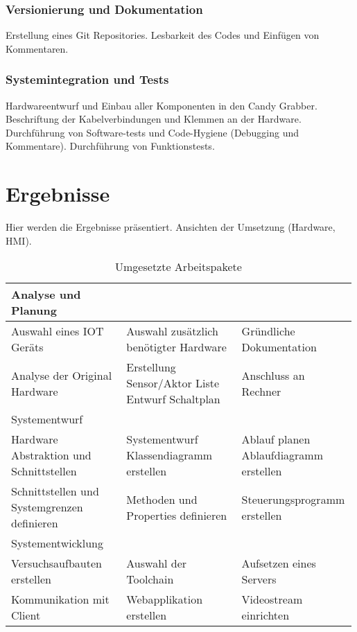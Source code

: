 \documentclass[BMR,Bachelor,ngerman]{twbook}%
\begin{document}
\subsection{Versionierung und Dokumentation}
Erstellung eines Git Repositories. Lesbarkeit des Codes und Einfügen von Kommentaren.
\subsection{Systemintegration und Tests}
Hardwareentwurf und Einbau aller Komponenten in den Candy Grabber. Beschriftung der Kabelverbindungen und Klemmen an der Hardware. Durchführung von Software-tests und Code-Hygiene (Debugging und Kommentare). Durchführung von Funktionstests.
%
\clearpage
\chapter{Ergebnisse}
Hier werden die Ergebnisse präsentiert. Ansichten der Umsetzung (Hardware, HMI).
\begin{table}[!htbp]
\caption{Umgesetzte Arbeitspakete}
\centering
\begin{tabular}{| p{0.33\linewidth}| p{0.33\linewidth} | p{0.33\linewidth}|}\hline
\rowcolor[gray]{0.8}Analyse und Planung & &\\\hline
Auswahl eines \ac{IOT} Geräts & Auswahl zusätzlich benötigter Hardware & Gründliche Dokumentation\\\hline
Analyse der Original Hardware & Erstellung Sensor/Aktor Liste \newline Entwurf Schaltplan & Anschluss an Rechner\\\hline
\rowcolor[gray]{0.8}Systementwurf &&\\\hline
Hardware Abstraktion und Schnittstellen & Systementwurf \newline Klassendiagramm erstellen & Ablauf planen \newline Ablaufdiagramm erstellen\\\hline
Schnittstellen und Systemgrenzen definieren & Methoden und Properties \newline definieren & Steuerungsprogramm erstellen\\\hline
\rowcolor[gray]{0.8}Systementwicklung &&\\\hline
Versuchsaufbauten erstellen & Auswahl der Toolchain &  Aufsetzen eines Servers \\\hline
Kommunikation mit Client & Webapplikation erstellen & Videostream einrichten\\\hline
\end{tabular}
\end{table}
%
\clearpage
\end{document}
